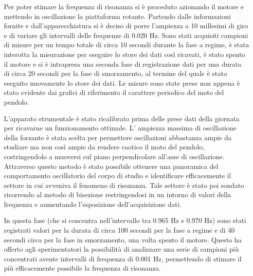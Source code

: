 Per poter stimare la frequenza di risonanza si è proceduto azionando il motore e mettendo in oscillazione la piattaforma rotante.
Partendo dalle informazioni fornite e dall’apparecchiatura si è deciso di porre l’ampiezza a 10 millesimi di giro e di variare gli
intervalli delle frequenze di 0.020 Hz. Sono stati acquisiti campioni di misure per un tempo totale di circa 10 secondi durante la fase a
regime, è stata interotta la misurazione per eseguire lo store dei dati così ricavati, è stato spento il motore e si è intrapresa una seconda
fase di registrazione dati per una durata di circa 20 secondi per la fase di smorzamento, al termine del quale è stato eseguito
nuovamente lo store dei dati. Le misure sono state prese non appena è stato evidente dai grafici di riferimento il carattere
periodico del moto del pendolo. 

L'apparato strumentale è stato ricalibrato prima delle prese dati della giornata per ricavarne un
funzionamento ottimale. L' ampiezza massima di oscillazione della forzante è stata scelta per permettere oscillazioni abbastanza
ampie da studiare ma non così ampie da rendere caotico il moto del pendolo, costringendolo a muoversi sul piano perpendicolare
all'asse di oscillazione. Attraverso questo metodo è stato possibile ottenere una panoramica del comportamento oscillatorio del 
corpo di studio e identificare efficacemente il settore in cui avveniva il fenomeno di risonanza. Tale settore è stato poi 
sondato ricorrendo al metodo di bisezione restringendosi in un intorno di valori della frequenza e aumentando l’esposizione 
dell’acquisizione dati. 

In questa fase (che si concentra nell’intervallo tra 0.965 Hz e 0.970 Hz) sono stati registrati valori per la durata di circa 100
secondi per la fase a regime e di 40 secondi circa per la fase in smorzamento, una volta spento il motore. Questo ha offerto agli
sperimentatori la possibilità di analizzare una serie di campioni più concentrati avente intervalli di frequenza di 0.001 Hz,
permettendo di stimare il più efficacemente possibile la frequenza di risonanza.
